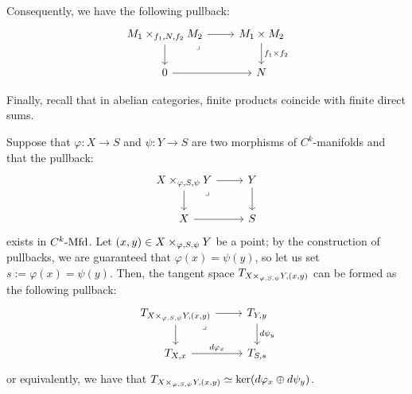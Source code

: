 \begin{remark}
            Consequently, we have the following pullback:
                $$
                    \begin{tikzcd}
                	{M_1 \x_{f_1, N, f_2} M_2} & {M_1 \x M_2} \\
                	0 & N
                	\arrow[from=1-1, to=1-2]
                	\arrow[from=1-1, to=2-1]
                	\arrow["\lrcorner"{anchor=center, pos=0.125}, draw=none, from=1-1, to=2-2]
                	\arrow["{f_1 \x f_2}", from=1-2, to=2-2]
                	\arrow[from=2-1, to=2-2]
                    \end{tikzcd}
                $$

            Finally, recall that in abelian categories, finite products coincide with finite direct sums.
        \end{remark}
        \begin{lemma} \label{lemma: tangent_spaces_of_pullbacks}
            Suppose that $\varphi: X \to S$ and $\psi: Y \to S$ are two morphisms of $C^k$-manifolds and that the pullback:
                $$
                    \begin{tikzcd}
                	{X \x_{\varphi, S, \psi} Y} & Y \\
                	X & S
                	\arrow[from=1-1, to=1-2]
                	\arrow[from=1-1, to=2-1]
                	\arrow["\lrcorner"{anchor=center, pos=0.125}, draw=none, from=1-1, to=2-2]
                	\arrow[from=1-2, to=2-2]
                	\arrow[from=2-1, to=2-2]
                    \end{tikzcd}
                $$
            exists in $C^k\text{-}\mathrm{Mfd}$. Let $(x, y) \in X \x_{\varphi, S, \psi} Y$ be a point; by the construction of pullbacks, we are guaranteed that $\varphi(x) = \psi(y)$, so let us set $s := \varphi(x) = \psi(y)$. Then, the tangent space $T_{X \x_{\varphi, S, \psi} Y, (x, y)}$ can be formed as the following pullback:
                $$
                    \begin{tikzcd}
                	{T_{X \x_{\varphi, S, \psi} Y, (x, y)}} & {T_{Y, y}} \\
                	{T_{X, x}} & {T_{S, s}}
                	\arrow[from=1-1, to=1-2]
                	\arrow[from=1-1, to=2-1]
                	\arrow["\lrcorner"{anchor=center, pos=0.125}, draw=none, from=1-1, to=2-2]
                	\arrow["{d\psi_y}", from=1-2, to=2-2]
                	\arrow["{d\varphi_x}", from=2-1, to=2-2]
                    \end{tikzcd}
                $$
            or equivalently, we have that $T_{X \x_{\varphi, S, \psi} Y, (x, y)} \cong \ker(d\varphi_x \oplus d\psi_y)$.
        \end{lemma}
